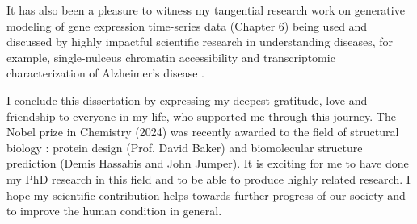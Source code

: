 It has also been a pleasure to witness my tangential research work on generative modeling of gene expression time-series data (Chapter 6) being used and discussed by highly impactful scientific research in understanding diseases, for example, single-nulceus chromatin accessibility and transcriptomic characterization of Alzheimer's disease \citep{morabito2021single}.

I conclude this dissertation by expressing my deepest gratitude, love and friendship to everyone in my life, who supported me through this journey. The Nobel prize in Chemistry (2024) was recently awarded to the field of structural biology : protein design (Prof. David Baker) and biomolecular structure prediction (Demis Hassabis and John Jumper). It is exciting for me to have done my PhD research in this field and to be able to produce highly related research. I hope my scientific contribution helps towards further progress of our society and to improve the human condition in general.
